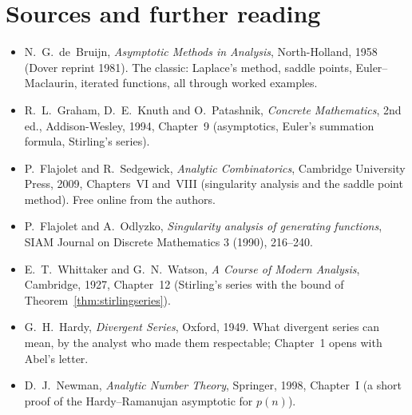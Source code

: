 \section*{Sources and further reading}

\begin{itemize}
\item N.~G.~de~Bruijn, \emph{Asymptotic Methods in Analysis}, North-Holland, 1958 (Dover reprint 1981). The classic: Laplace's method, saddle points,
Euler--Maclaurin, iterated functions, all through worked examples.
\item R.~L.~Graham, D.~E.~Knuth and O.~Patashnik, \emph{Concrete Mathematics}, 2nd ed., Addison-Wesley, 1994, Chapter~9 (asymptotics, Euler's
summation formula, Stirling's series).
\item P.~Flajolet and R.~Sedgewick, \emph{Analytic Combinatorics}, Cambridge University Press, 2009, Chapters~VI and~VIII (singularity analysis and the
saddle point method). Free online from the authors.
\item P.~Flajolet and A.~Odlyzko, \emph{Singularity analysis of generating functions}, SIAM Journal on Discrete Mathematics 3 (1990), 216--240.
\item E.~T.~Whittaker and G.~N.~Watson, \emph{A Course of Modern Analysis}, Cambridge, 1927, Chapter~12 (Stirling's series with the bound of
Theorem~\ref{thm:stirlingseries}).
\item G.~H.~Hardy, \emph{Divergent Series}, Oxford, 1949. What divergent series can mean, by the analyst who made them respectable; Chapter~1 opens
with Abel's letter.
\item D.~J.~Newman, \emph{Analytic Number Theory}, Springer, 1998, Chapter~I (a short proof of the Hardy--Ramanujan asymptotic for $p(n)$).
\end{itemize}
